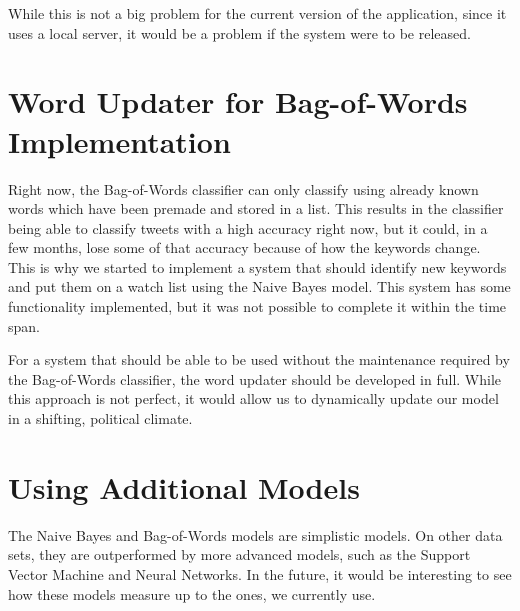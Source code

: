 While this is not a big problem for the current version of the application,
since it uses a local server, it would be a problem if the system were to be
released.

\section*{Word Updater for Bag-of-Words Implementation}
Right now, the Bag-of-Words classifier can only classify using already known
words which have been premade and stored in a list. This results in the
classifier being able to classify tweets with a high accuracy right now, but it
could, in a few months, lose some of that accuracy because of how the keywords
change. This is why we started to implement a system that should identify new
keywords and put them on a watch list using the Naive Bayes model. This
system has some functionality implemented, but it was not possible to complete
it within the time span.

For a system that should be able to be used without the maintenance required by
the Bag-of-Words classifier, the word updater should be developed in full. While
this approach is not perfect, it would allow us to dynamically update our model
in a shifting, political climate.

\section*{Using Additional Models}
The Naive Bayes and Bag-of-Words models are simplistic models. On other
data sets, they are outperformed by more advanced models, such as the Support
Vector Machine and Neural Networks. In the future, it would be interesting to
see how these models measure up to the ones, we currently use.

